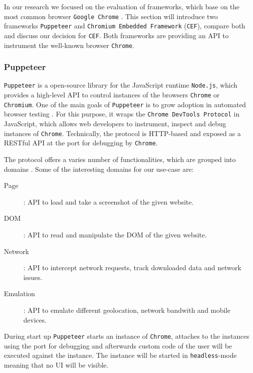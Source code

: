 In our research we focused on the evaluation of frameworks, which base on the most common browser \texttt{Google Chrome} \cite{CommonBrowsers}. This section will introduce two frameworks \texttt{Puppeteer} and \texttt{Chromium Embedded Framework} (\texttt{CEF}), compare both and discuss our decision for \texttt{CEF}. Both frameworks are providing an API to instrument the well-known browser \texttt{Chrome}.

\subsubsection{Puppeteer}
\texttt{Puppeteer} is a open-source library for the JavaScript runtime \texttt{Node.js}, which provides a high-level API to control instances of the browsers \texttt{Chrome} or \texttt{Chromium}. One of the main goals of \texttt{Puppeteer} is to grow adoption in automated browser testing \cite{PuppeteerFAQ}.  For this purpose, it wraps the \texttt{Chrome DevTools Protocol} in JavaScript, which allows web developers to instrument, inspect and debug instances of \texttt{Chrome}. Technically, the protocol is HTTP-based and exposed as a RESTful API at the port for debugging by \texttt{Chrome}.

The protocol offers a varies number of functionalities, which are grouped into domains \cite{DevToolsProtocol}. Some of the interesting domains for our use-case are:
\begin{description}
	\item[Page]: API to load and take a screenshot of the given website.
	\item[DOM]: API to read and manipulate the DOM of the given website.
	\item[Network]: API to intercept network requests, track downloaded data and network issues.
	\item[Emulation]: API to emulate different geolocation, network bandwith and mobile devices.
\end{description}

During start up \texttt{Puppeteer} starts an instance of \texttt{Chrome}, attaches to the instances using the port for debugging and afterwards custom code of the user will be executed against the instance. The instance will be started in \texttt{headless}-mode meaning that no UI will be visible.

